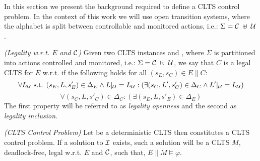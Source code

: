 In this section we present the background required to define a CLTS control problem.  In the context of this work we will use open transition systems, where the alphabet is split between controllable and monitored actions, i.e.: $\Sigma=\mathcal{C} \; \uplus \;\mathcal{U}$.



\begin{definition}
	\label{def:legal_clts} \emph{(Legality w.r.t. $E$ and $\mathcal{C}$)} 
	Given two CLTS instances  and , where $\Sigma$ is partitioned into actions controlled and monitored, i.e.: $\Sigma=\mathcal{C} \; \uplus \;\mathcal{U}$, we say that $C$ is a legal CLTS for $E$ w.r.t. \controlSet if the following holds for all $(s_E,s_C) \in E \parallel C$:
	\[\forall L_{\mathcal{U}}\text{ s.t. }  (s_E, L, s'_E) \in \Delta_E \wedge L|_{\mathcal{U}} = L_{\mathcal{U}}:( \exists (s_C, L', s'_C) \in \Delta_C \wedge L'|_{\mathcal{U}} = L_{\mathcal{U}})\]
	\[\forall (s_C, L, s'_C) \in \Delta_C:( \exists (s_E, L, s'_E) \in \Delta_E)\]
	The first property will be referred to as \emph{legality openness} and the second as \emph{legality inclusion}.
\end{definition}

\begin{definition}
	\label{def:clts_control_problem} \emph{(CLTS Control Problem)} 
	Let  be a deterministic CLTS then \controlProblemDef constitutes a CLTS control problem. If a solution to $\mathcal{I}$ exists, such a solution will be a CLTS $M$, deadlock-free, legal w.r.t. $E$ and $\mathcal{C}$, such that, $E \parallel M \models \varphi$.
\end{definition}
